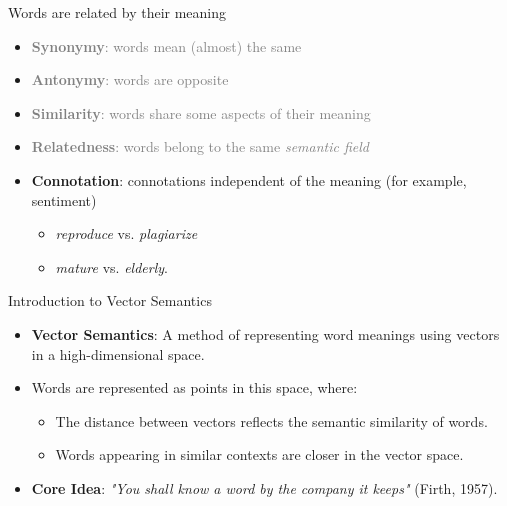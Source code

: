 \documentclass{beamer}
\begin{document}
\begin{frame}{Words are related by their meaning}
  \begin{itemize}
      \item \textcolor{gray}{\textbf{Synonymy}: words mean (almost) the same }
      \item \textcolor{gray}{\textbf{Antonymy}: words are opposite}
      \item \textcolor{gray}{\textbf{Similarity}: words share some aspects of their meaning}
      \item \textcolor{gray}{\textbf{Relatedness}: words belong to the same \textit{semantic field}}
      \item \textbf{Connotation}: connotations independent of the meaning (for example, sentiment)
      \begin{itemize}
          \item \textit{reproduce} vs. \textit{plagiarize}
          \item \textit{mature} vs. \textit{elderly}.
      \end{itemize}
  \end{itemize}
\end{frame}

\begin{frame}{Introduction to Vector Semantics}
    \begin{itemize}
        \item \textbf{Vector Semantics}: A method of representing word meanings using vectors in a high-dimensional space.
        \item Words are represented as points in this space, where:
        \begin{itemize}
            \item The distance between vectors reflects the semantic similarity of words.
            \item Words appearing in similar contexts are closer in the vector space.
        \end{itemize}
        \item \textbf{Core Idea}: \textit{"You shall know a word by the company it keeps"} (Firth, 1957).
    \end{itemize}
\end{frame}
\end{document}
